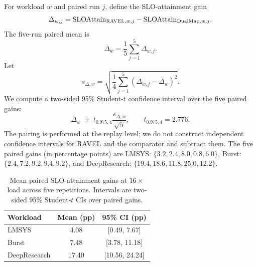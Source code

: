 For workload $w$ and paired run $j$, define the SLO-attainment gain
\begin{equation}
    \Delta_{w,j}
    =
    \mathrm{SLOAttain}_{\textsc{RAVEL},w,j}
    -
    \mathrm{SLOAttain}_{\mathrm{DualMap},w,j}.
    \label{eq:appendix:paired-gain}
\end{equation}
The five-run paired mean is
\begin{equation}
    \overline{\Delta}_w
    =
    \frac{1}{5}
    \sum_{j=1}^{5}
    \Delta_{w,j}.
    \label{eq:appendix:mean-paired-gain}
\end{equation}
Let
\begin{equation}
    s_{\Delta,w}
    =
    \sqrt{
        \frac{1}{4}
        \sum_{j=1}^{5}
        \left(
            \Delta_{w,j}-\overline{\Delta}_w
        \right)^2
    }.
    \label{eq:appendix:paired-std}
\end{equation}
We compute a two-sided 95\% Student-$t$ confidence interval over the five
paired gains:
\begin{equation}
    \overline{\Delta}_w
    \;\pm\;
    t_{0.975,4}
    \frac{s_{\Delta,w}}{\sqrt{5}},
    \qquad
    t_{0.975,4}=2.776.
    \label{eq:appendix:paired-ci}
\end{equation}
The pairing is performed at the replay level; we do not construct independent
confidence intervals for RAVEL and the comparator and subtract them.  The five
paired gains (in percentage points) are
LMSYS: $\{3.2,2.4,8.0,0.8,6.0\}$,
Burst: $\{2.4,7.2,9.2,9.4,9.2\}$, and
DeepResearch: $\{19.4,18.6,11.8,25.0,12.2\}$.

\begin{table}[t]
    \centering
    \small
    \caption{Mean paired SLO-attainment gains at $16\times$ load across five
    repetitions.  Intervals are two-sided 95\% Student-$t$ CIs over paired
    gains.}
    \label{tab:appendix:five-run-deltas}
    \begin{tabular}{lcc}
        \toprule
        \textbf{Workload} &
        \textbf{Mean (pp)} &
        \textbf{95\% CI (pp)} \\
        \midrule
        LMSYS        & 4.08  & [0.49, 7.67]   \\
        Burst        & 7.48  & [3.78, 11.18]  \\
        DeepResearch & 17.40 & [10.56, 24.24] \\
        \bottomrule
    \end{tabular}
\end{table}

